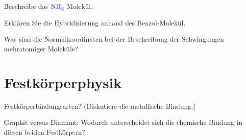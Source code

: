 \documentclass[a5paper,12pt,ngerman,print,grid=front]{kartei}
\let\oldce\ce
\renewcommand*{\ce}[1]{\begingroup\color{blue}\oldce{#1}\endgroup}
\begin{document}
	\begin{karte}{
		Beschreibe das $\ce{NH3}$ Molekül.
        }
          
          
          
    \end{karte}


	\begin{karte}{
		Erklären Sie die Hybridisierung anhand des Benzol-Molekül.
        }
          
          
          
    \end{karte}


	\begin{karte}{
		Was sind die Normalkoordinaten bei der Beschreibung der Schwingungen mehratomiger Moleküle?
        }
          
          
          
    \end{karte}




\section*{Festkörperphysik}



	\begin{karte}{
		Festkörperbindungsarten? (Diskutiere die metallische Bindung.)
        }
          
          
          
    \end{karte}


	\begin{karte}{
		Graphit versus Diamant: Wodurch unterscheidet sich die chemische Bindung in diesen
        beiden Festkörpern?
		}
          
          
          
    \end{karte}
\end{document}
